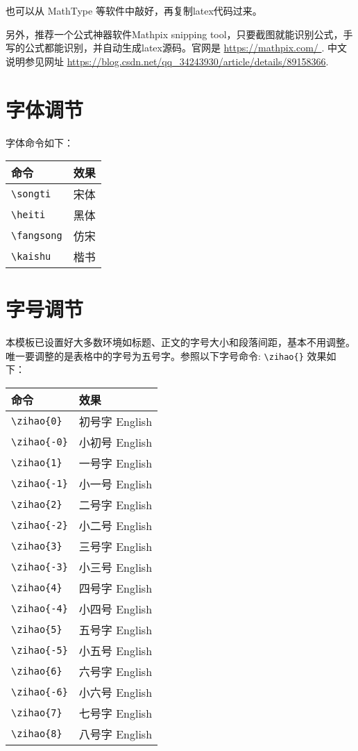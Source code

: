 \documentclass[forprint]{HedaBachelor}
\begin{document}
也可以从 MathType 等软件中敲好，再复制latex代码过来。

另外，推荐一个公式神器软件Mathpix snipping tool，只要截图就能识别公式，手写的公式都能识别，并自动生成latex源码。官网是 \url{https://mathpix.com/ }. 中文说明参见网址 
\url{https://blog.csdn.net/qq_34243930/article/details/89158366}.

\section{字体调节}
字体命令如下：

\begin{tabular}{ll}
	\hline %
	命令             &  效果            \\
	\hline %
	\verb|\songti|   & {\songti 宋体}   \\
	\verb|\heiti|    & {\heiti 黑体}    \\
	\verb|\fangsong| & {\fangsong 仿宋} \\
	\verb|\kaishu|   & {\kaishu 楷书}   \\
	\hline %
\end{tabular}

\section{字号调节}
本模板已设置好大多数环境如标题、正文的字号大小和段落间距，基本不用调整。唯一要调整的是表格中的字号为五号字。参照以下字号命令: \verb|\zihao{}|   效果如下：

\begin{tabular}{ll}
	\hline %
    命令             &  效果            \\
	\hline %
	\verb|\zihao{0}| &\zihao{0}  初号字 English \\
	\verb|\zihao{-0}|&\zihao{-0} 小初号 English \\
	\verb|\zihao{1} |&\zihao{1}  一号字 English \\
	\verb|\zihao{-1}|&\zihao{-1} 小一号 English \\
	\verb|\zihao{2} |&\zihao{2}  二号字 English \\
	\verb|\zihao{-2}|&\zihao{-2} 小二号 English \\
	\verb|\zihao{3} |&\zihao{3}  三号字 English \\
	\verb|\zihao{-3}|&\zihao{-3} 小三号 English \\
	\verb|\zihao{4} |&\zihao{4}  四号字 English \\
	\verb|\zihao{-4}|&\zihao{-4} 小四号 English \\
	\verb|\zihao{5} |&\zihao{5}  五号字 English \\
	\verb|\zihao{-5}|&\zihao{-5} 小五号 English \\
	\verb|\zihao{6} |&\zihao{6}  六号字 English \\
	\verb|\zihao{-6}|&\zihao{-6} 小六号 English \\
	\verb|\zihao{7} |&\zihao{7}  七号字 English \\
	\verb|\zihao{8} |&\zihao{8}  八号字 English \\
	\hline %
\end{tabular}
\end{document}
